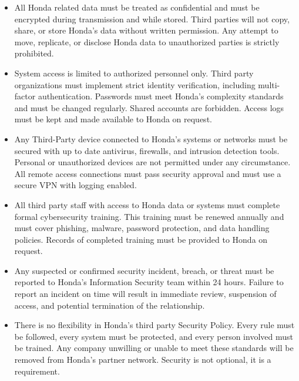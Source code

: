 \begin{itemize}
    \item \textbf{} All Honda related data must be treated as confidential and must be encrypted during transmission and while stored. Third parties will not copy, share, or store Honda’s data without written permission. Any attempt to move, replicate, or disclose Honda data to unauthorized parties is strictly prohibited.
    
    \item \textbf{}  System access is limited to authorized personnel only. Third party organizations must implement strict identity verification, including multi-factor authentication. Passwords must meet Honda’s complexity standards and must be changed regularly. Shared accounts are forbidden. Access logs must be kept and made available to Honda on request.

     \item \textbf{} Any Third-Party device connected to Honda’s systems or networks must be secured with up to date antivirus, firewalls, and intrusion detection tools. Personal or unauthorized devices are not permitted under any circumstance. All remote access connections must pass security approval and must use a secure VPN with logging enabled.

    \item \textbf{}  All third party staff with access to Honda data or systems must complete formal cybersecurity training. This training must be renewed annually and must cover phishing, malware, password protection, and data handling policies. Records of completed training must be provided to Honda on request.

    \item \textbf{}  Any suspected or confirmed security incident, breach, or threat must be reported to Honda’s Information Security team within 24 hours. Failure to report an incident on time will result in immediate review, suspension of access, and potential termination of the relationship.

    \item \textbf{}There is no flexibility in Honda’s third party Security Policy. Every rule must be followed, every system must be protected, and every person involved must be trained. Any company unwilling or unable to meet these standards will be removed from Honda’s partner network. Security is not optional, it is a requirement.
    
\end{itemize}

